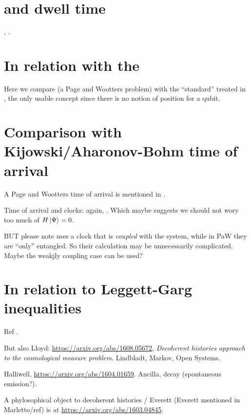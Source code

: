 \section{and dwell time}

\cite[\S 5]{TQM2}, \cite{Halliwell_DwellClocks}.

\section{In relation with the }

Here we compare \cite{Moreva:synthetic, Moreva:illustration}
(a Page and Wootters problem)
with the ``standard'' 
treated in \cite[\S 5.5.2]{TQM2},
the only usable concept since there is no notion of position
for a qubit.

\section{Comparison with Kijowski/Aharonov-Bohm time of arrival}

A Page and Wootters time of arrival is mentioned in \cite{Gambini_PW}.

Time of arrival and clocks: again, \cite{Halliwell_DwellClocks}.
Which maybe suggests we should not wory too much of $H\ket{\Psi} = 0$. 

BUT please note \cite{Halliwell_DwellClocks} uses a clock that is
\emph{coupled} with the system, while in PaW they are ``only'' entangled.
So their calculation may be unnecessarily complicated.
Maybe the weakjly coupling case can be used?

\section{In relation to Leggett-Garg inequalities}
Ref \cite{LeggettGarg+PageWootters}.

But also Lloyd: \url{https://arxiv.org/abs/1608.05672},
\emph{Decoherent histories approach to the cosmological measure problem}.
Lindbladt, Markov, Open Systems.

Halliwell, \url{https://arxiv.org/abs/1604.01659}. Ancilla, decay (spontaneous emission?).

A phylosophical object to decoherent histories / Everett (Everett mentioned in Marletto/ref)
is at
\url{https://arxiv.org/abs/1603.04845}.


